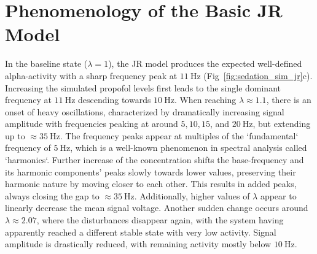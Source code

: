 \toggletrue{drawLocRoc}
\def\simRunName{JR_SEDATION_150}
\def\simRunTime{151}
\def\locStart{1.1}
\def\locST{10.07}%
\def\locEnd{2.07}
\def\locET{40.38}%
\def\rocStart{2.0}
\def\rocST{112.88}%
\def\rocEnd{1.00}
\def\rocET{144.46}%
\section{Phenomenology of the Basic JR Model}\label{sec:phenomenology-of-the-basic-jr-model}
In the baseline state ($\lambda = 1$), the JR model produces the expected well-defined alpha-activity
    with a sharp frequency peak at $\SI{11}{\hertz}$ (Fig~\ref{fig:sedation_sim_jr}c).
    Increasing the simulated propofol levels first leads to the single dominant frequency at $\SI{11}{\hertz} $
    descending towards $\SI{10}{\hertz} $.
    When reaching $\lambda \approx \locStart $,
    there is an onset of heavy oscillations, characterized by dramatically increasing signal amplitude
    with frequencies peaking at around $5, 10, 15$, and $ \SI{20}{\hertz} $,
    but extending up to $\approx \SI{35}{\hertz} $.
    The frequency peaks appear at multiples of the `fundamental` frequency of $\SI{5}{\hertz}$,
    which is a well-known phenomenon in spectral analysis called `harmonics`.
    Further increase of the concentration shifts the base-frequency and its harmonic components' peaks
    slowly towards lower values, preserving their harmonic nature by moving closer to each other.
    This results in added peaks, always closing the gap to $\approx \SI{35}{\hertz} $.
    Additionally, higher values of $\lambda$ appear to linearly decrease the mean signal voltage.
    Another sudden change occurs around $\lambda \approx \locEnd $,
    where the disturbances disappear again,
    with the system having apparently reached a different stable state with very low activity.
    Signal amplitude is drastically reduced, with remaining activity mostly below $\SI{10}{\hertz}$.
